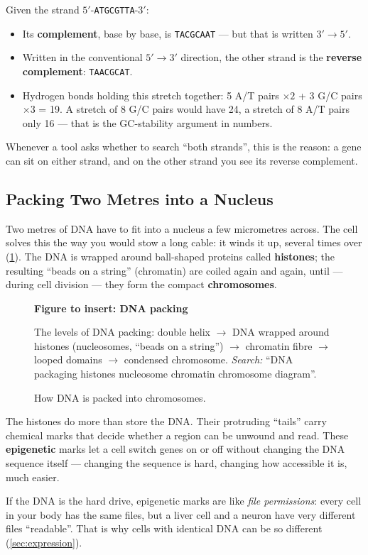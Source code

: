 \documentclass[11pt, oneside]{book}
\newcommand{\seq}[1]{\texttt{#1}}
\newcommand{\figureplaceholder}[5]{%
\begin{figure}[htbp]
\centering
\begin{tcolorbox}[unbreakable,width=\linewidth,height=#1,colback=accent!3,
  colframe=accent!30,boxrule=0.5pt,arc=2.5mm,sharp corners=all,
  valign=center,halign=center,fontupper=\small]
{\bfseries\color{accent}Figure to insert: #2}\par\medskip
{\color{gray!75!black}#3}
\end{tcolorbox}
\caption{#4}\label{#5}
\end{figure}}
\let\originalsubsection\subsection
\renewcommand{\subsection}{\Needspace{6\baselineskip}\originalsubsection}
\begin{document}
\begin{exbox}[title={The other strand}]
Given the strand $5'$-\seq{ATGCGTTA}-$3'$:
\begin{itemize}
  \item Its \textbf{complement}, base by base, is \seq{TACGCAAT} --- but that
    is written $3' \to 5'$.
  \item Written in the conventional $5' \to 3'$ direction, the other strand is
    the \textbf{reverse complement}: \seq{TAACGCAT}.
  \item Hydrogen bonds holding this stretch together: 5 A/T pairs $\times 2$ +
    3 G/C pairs $\times 3$ = 19. A stretch of 8 G/C pairs would have 24, a
    stretch of 8 A/T pairs only 16 --- that is the GC-stability argument in
    numbers.
\end{itemize}
Whenever a tool asks whether to search ``both strands'', this is the reason:
a gene can sit on either strand, and on the other strand you see its reverse
complement.
\end{exbox}

\subsection{Packing Two Metres into a Nucleus}
\label{sec:packing}

Two metres of DNA have to fit into a nucleus a few micrometres across. The
cell solves this the way you would stow a long cable: it winds it up, several
times over (\cref{fig:packing}). The DNA is wrapped around ball-shaped
proteins called \textbf{histones}; the resulting ``beads on a string''
(chromatin) are coiled again and again, until --- during cell division ---
they form the compact \textbf{chromosomes}.

\figureplaceholder{4.2cm}{DNA packing}%
{The levels of DNA packing: double helix $\to$ DNA wrapped around histones
(nucleosomes, ``beads on a string'') $\to$ chromatin fibre $\to$ looped
domains $\to$ condensed chromosome. \textit{Search:} ``DNA packaging
histones nucleosome chromatin chromosome diagram''.}%
{How DNA is packed into chromosomes.}{fig:packing}

The histones do more than store the DNA. Their protruding ``tails'' carry
chemical marks that decide whether a region can be unwound and read. These
\textbf{epigenetic} marks let a cell switch genes on or off without changing
the DNA sequence itself --- changing the sequence is hard, changing how
accessible it is, much easier.

\begin{intbox}
If the DNA is the hard drive, epigenetic marks are like \emph{file
permissions}: every cell in your body has the same files, but a liver cell
and a neuron have very different files ``readable''. That is why cells with
identical DNA can be so different (\cref{sec:expression}).
\end{intbox}
\end{document}
